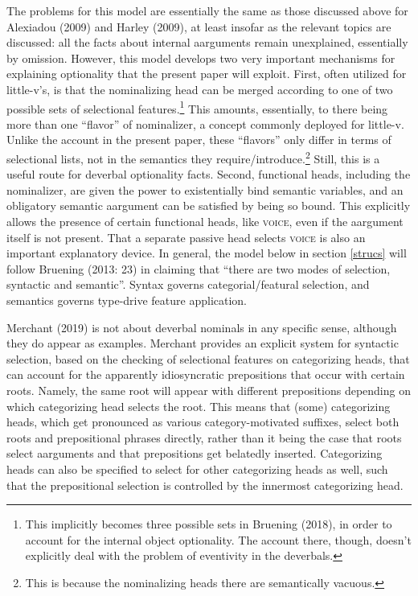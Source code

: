 \documentclass[12pt]{article}
\begin{document}
The problems for this model are essentially the same as those discussed above for Alexiadou (2009) and Harley (2009), at least insofar as the relevant topics are discussed: all the facts about internal aarguments remain unexplained, essentially by omission. However, this model develops two very important mechanisms for explaining optionality that the present paper will exploit. First, often utilized for little-v's, is that the nominalizing head can be merged according to one of two possible sets of selectional features.\footnote{ This implicitly becomes three possible sets in Bruening (2018), in order to account for the internal object optionality. The account there, though, doesn't explicitly deal with the problem of eventivity in the deverbals.} This amounts, essentially, to there being more than one ``flavor'' of nominalizer, a concept commonly deployed for little-v. Unlike the account in the present paper, these ``flavors'' only differ in terms of selectional lists, not in the semantics they require/introduce.\footnote{ This is because the nominalizing heads there are semantically vacuous.} Still, this is a useful route for deverbal optionality facts. Second, functional heads, including the nominalizer, are given the power to existentially bind semantic variables, and an obligatory semantic aargument can be satisfied by being so bound. This explicitly allows the presence of certain functional heads, like \textsc{voice}, even if the aargument itself is not present. That a separate passive head selects \textsc{voice} is also an important explanatory device. In general, the model below in section \ref{strucs} will follow Bruening (2013: 23) in claiming that ``there are two modes of selection, syntactic and semantic''. Syntax governs categorial/featural selection, and semantics governs type-drive feature application.

Merchant (2019) is not about deverbal nominals in any specific sense, although they do appear as examples. Merchant provides an explicit system for syntactic selection, based on the checking of selectional features on categorizing heads, that can account for the apparently idiosyncratic prepositions that occur with certain roots. Namely, the same root will appear with different prepositions depending on which categorizing head selects the root. This means that (some) categorizing heads, which get pronounced as various category-motivated suffixes, select both roots and prepositional phrases directly, rather than it being the case that roots select aarguments and that prepositions get belatedly inserted. Categorizing heads can also be specified to select for other categorizing heads as well, such that the prepositional selection is controlled by the innermost categorizing head. 
\end{document}
